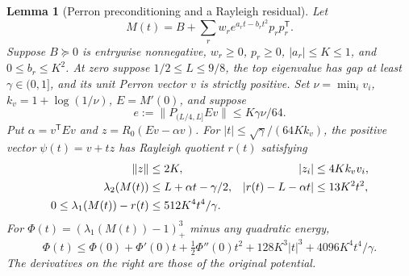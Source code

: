 \documentclass[11pt]{amsart}
\newtheorem{lemma}[theorem]{Lemma}
\theoremstyle{definition}\newtheorem{definition}[theorem]{Definition}
\theoremstyle{remark}\newtheorem{remark}[theorem]{Remark}
\numberwithin{equation}{section}
\newcommand{\T}{\mathsf T}
\begin{document}
\begin{lemma}[Perron preconditioning and a Rayleigh residual]\label{b:lem:perron}
Let
\[ M(t)=B+\sum_r w_r e^{a_rt-b_rt^2}p_rp_r^\T. \]
Suppose
$B\succeq0$ is entrywise nonnegative, $w_r\ge0$, $p_r\ge0$,
$|a_r|\le K\le1$, and $0\le b_r\le K^2$.
At zero suppose $1/2\le L\le9/8$, the top eigenvalue has gap at least
$\gamma\in(0,1]$, and its unit Perron vector $v$ is strictly positive.
Set $\nu=\min_i v_i$, $k_v=1+\log(1/\nu)$, $E=M'(0)$, and suppose
\begin{equation}\label{b:eq:perronleak}
 e:=\|P_{(L/4,L]}Ev\|\le K\gamma\nu/64.
\end{equation}
Put $\alpha=v^\T Ev$ and $z=R_0(Ev-\alpha v)$.
For $|t|\le\sqrt\gamma/(64Kk_v)$, the positive vector
$\psi(t)=v+tz$ has Rayleigh quotient $r(t)$ satisfying
\begin{align}\label{b:eq:temple}
 \|z\|&\le2K,& |z_i|&\le4Kk_vv_i,\notag\\
 \lambda_2(M(t))&\le L+\alpha t-\gamma/2,&
 |r(t)-L-\alpha t|&\le13K^2t^2,\notag\\
 0\le\lambda_1(M(t))-r(t)&\le512K^4t^4/\gamma.
\end{align}
For $\Phi(t)=(\lambda_1(M(t))-1)_+^3$ minus any quadratic energy,
\begin{equation}\label{b:eq:perronremainder}
 \Phi(t)\le\Phi(0)+\Phi'(0)t+\tfrac12\Phi''(0)t^2
                   +128K^3|t|^3+4096K^4t^4/\gamma.
\end{equation}
The derivatives on the right are those of the original potential.
\end{lemma}
\end{document}
